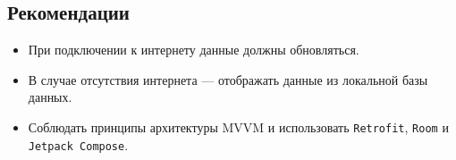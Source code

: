 \subsection{Рекомендации} \begin{itemize} \item При подключении к интернету данные должны обновляться. \item В случае отсутствия интернета — отображать данные из локальной базы данных. \item Соблюдать принципы архитектуры MVVM и использовать \texttt{Retrofit}, \texttt{Room} и \texttt{Jetpack Compose}. \end{itemize}
